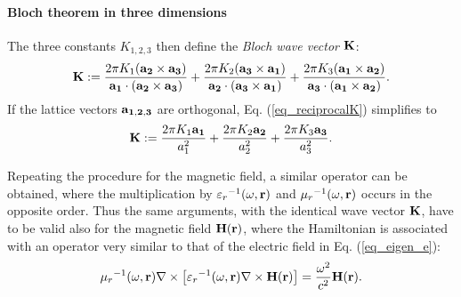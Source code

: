 \paragraph{Bloch theorem in three dimensions} %
The three constants $K_{1,2,3}$ then define the \textit{Bloch wave vector} ${\mathbf{K}}$: 
\begin{equation} {\mathbf{K}} := 
\frac{2\pi K_1({\mathbf{a_2}}\times{\mathbf{a_3}})}{{\mathbf{a_1}}\cdot({\mathbf{a_2}}\times{\mathbf{a_3}})} +  
\frac{2\pi K_2({\mathbf{a_3}}\times{\mathbf{a_1}})}{{\mathbf{a_2}}\cdot({\mathbf{a_3}}\times{\mathbf{a_1}})} +  
\frac{2\pi K_3({\mathbf{a_1}}\times{\mathbf{a_2}})}{{\mathbf{a_3}}\cdot({\mathbf{a_1}}\times{\mathbf{a_2}})}.
\label{eq_reciprocalK}\end{equation}
If the lattice vectors ${\mathbf{a_{1,2,3}}}$ are orthogonal, Eq. (\ref{eq_reciprocalK}) simplifies to
\begin{equation} {\mathbf{K}} := 
	\frac{2\pi K_1 {\mathbf{a_1}}}{a_1^{2}} +  
	\frac{2\pi K_2 {\mathbf{a_2}}}{a_2^{2}} +  
	\frac{2\pi K_3 {\mathbf{a_3}}}{a_3^{2}}.
\label{eq_reciprocalKorto}\end{equation}

Repeating the procedure for the magnetic field, a similar operator can be obtained, where the multiplication by ${\varepsilon_r}^{-1}(\omega,{\mathbf{r}})$ and ${\mu_r}^{-1 }(\omega,{\mathbf{r}})$ occurs in the opposite order. Thus the same arguments, with the identical wave vector ${\mathbf{K}}$, have to be valid also for the magnetic field $\mathbf{H}({\mathbf{r}})$, where the Hamiltonian is associated with an operator very similar to that of the electric field in Eq. (\ref{eq_eigen_e}):
\begin{equation}
{\mu_r}^{-1 }(\omega,{\mathbf{r}}) \nabla\times \left[{\varepsilon_r}^{-1}(\omega,{\mathbf{r}}) \nabla\times \mathbf{H}({\mathbf{r}})\right] = \frac{\omega^2}{c^2}\mathbf{H}({\mathbf{r}}).   \label{eq_eigen_h}
\end{equation}

